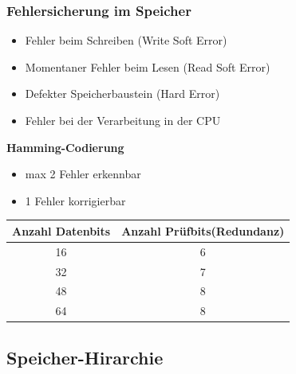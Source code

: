 \subsubsection{Fehlersicherung im Speicher}
\begin{itemize}
    \item Fehler beim Schreiben (Write Soft Error)
    \item Momentaner Fehler beim Lesen (Read Soft Error)
    \item Defekter Speicherbaustein (Hard Error)
    \item Fehler bei der Verarbeitung in der CPU
\end{itemize}
\textbf{Hamming-Codierung}\newline
\begin{itemize}
    \item max 2 Fehler erkennbar
    \item  1 Fehler korrigierbar
\end{itemize}
\begin{tabular}{|c|c|}
    \hline
    \textbf{Anzahl Datenbits}&\textbf{Anzahl Prüfbits}(Redundanz)\\ \hline
    16  & 6 \\ \hline
    32  & 7 \\ \hline
    48  & 8 \\ \hline
    64  & 8 \\ \hline
\end{tabular}

\subsection{Speicher-Hirarchie}
